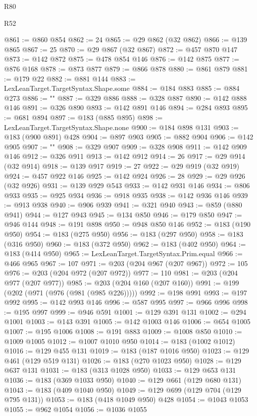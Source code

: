 \begin{lexlean}{R80}
\begin{lexlean}{R52}
\begin{coremodule}
{{{{{{{{{{{{{{{{{{{{{{{{{{{{{{{{{{{{{{{{{{{{{{{{{{{{{{{{{{{{{{{{{{{{{{{{{{{{{{{{{{{{{{{{{{{{{{{{{{{{{{{{{{{{{{{{{{{{{{{{{{{{{{{{{{{{{{{{{{{{{{{{{{{{{{{{{{{{{{{{{{{{{{{{{{{{{{{{{{{{{{{{{{{{{{{{{{{{{{@861 := @860 @854
@862 := 24
@865 := @29 @862 (@32 @862)
@866 := @139 @865
@867 := 25
@870 := @29 @867 (@32 @867)
@872 := @457 @870 @147
@873 := @142 @872
@875 := @478 @854 @146
@876 := @142 @875
@877 := @876 @168
@878 := @873 @877
@879 := @866 @878
@880 := @861 @879
@881 := @179 @22
@882 := @881 @144
@883 := LexLeanTarget.TargetSyntax.Shape.some
@884 := @184 @883
@885 := @884 @273
@886 := "{"
@887 := @329 @886
@888 := @328 @887
@890 := @142 @888 @146
@891 := @326 @890
@893 := @142 @891 @146
@894 := @284 @893
@895 := @681 @894
@897 := @183 (@885 @895)
@898 := LexLeanTarget.TargetSyntax.Shape.none
@900 := @184 @898 @131
@903 := @183 (@900 @891) @428
@904 := @897 @903
@905 := @882 @904
@906 := @142 @905
@907 := "}"
@908 := @329 @907
@909 := @328 @908
@911 := @142 @909 @146
@912 := @326 @911
@913 := @142 @912
@914 := 26
@917 := @29 @914 (@32 @914)
@918 := @139 @917
@919 := 27
@922 := @29 @919 (@32 @919)
@924 := @457 @922 @146
@925 := @142 @924
@926 := 28
@929 := @29 @926 (@32 @926)
@931 := @139 @929 @543
@933 := @142 @931 @146
@934 := @806 @933
@935 := @925 @934
@936 := @918 @935
@938 := @142 @936 @146
@939 := @913 @938
@940 := @906 @939
@941 := @321 @940
@943 := @859 (@880 @941)
@944 := @127 @943
@945 := @134 @850
@946 := @179 @850
@947 := @946 @144
@948 := @191 @898
@950 := @948 @850 @146
@952 := @183 (@190 @950)
@954 := @183 (@275 @950)
@956 := @183 (@297 @950)
@958 := @183 (@316 @950)
@960 := @183 (@372 @950)
@962 := @183 (@402 @950)
@964 := @183 (@414 @950)
@965 := LexLeanTarget.TargetSyntax.Prim.equal
@966 := @466 @965
@967 := 107
@971 := @203 (@204 @967 (@207 @967))
@972 := 105
@976 := @203 (@204 @972 (@207 @972))
@977 := 110
@981 := @203 (@204 @977 (@207 @977))
@985 := @203 (@204 @160 (@207 @160))
@991 := @199 (@202 (@971 (@976 (@981 (@985 @226)))))
@992 := @198 @991
@993 := @197 @992
@995 := @142 @993 @146
@996 := @587 @995
@997 := @966 @996
@998 := @195 @997
@999 := @946 @591
@1001 := @129 @391 @131
@1002 := @294 @1001
@1003 := @143 @391
@1005 := @142 @1003 @146
@1006 := @654 @1005
@1007 := @195 @1006
@1008 := @191 @883
@1009 := @1008 @850
@1010 := @1009 @1005
@1012 := @1007 @1010 @950
@1014 := @183 (@1002 @1012)
@1016 := @129 @455 @131
@1019 := @183 (@187 @1016 @950)
@1023 := @129 @461 (@129 @519 @131)
@1026 := @183 (@270 @1023 @950)
@1028 := @129 @637 @131
@1031 := @183 (@313 @1028 @950)
@1033 := @129 @653 @131
@1036 := @183 (@369 @1033 @950)
@1040 := @129 @661 (@129 @680 @131)
@1043 := @183 (@409 @1040 @950)
@1049 := @129 @699 (@129 @704 (@129 @795 @131))
@1053 := @183 (@418 @1049 @950) @428
@1054 := @1043 @1053
@1055 := @962 @1054
@1056 := @1036 @1055
}}}}}}}}}}}}}}}}}}}}}}}}}}}}}}}}}}}}}}}}}}}}}}}}}}}}}}}}}}}}}}}}}}}}}}}}}}}}}}}}}}}}}}}}}}}}}}}}}}}}}}}}}}}}}}}}}}}}}}}}}}}}}}}}}}}}}}}}}}}}}}}}}}}}}}}}}}}}}}}}}}}}}}}}}}}}}}}}}}}}}}}}}}}}}}}}}}}}}}
\end{coremodule}
\end{lexlean}
\end{lexlean}
